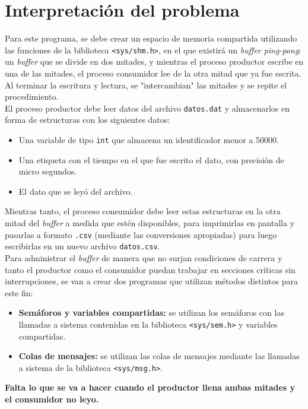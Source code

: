 \section{Interpretación del problema}
Para este programa, se debe crear un espacio de memoria compartida utilizando las funciones de la biblioteca \texttt{<sys/shm.h>}, en el que existirá un \textit{buffer ping-pong}: un \textit{buffer} que se divide en dos mitades, y mientras el proceso productor escribe en una de las mitades, el proceso consumidor lee de la otra mitad que ya fue escrita. Al terminar la escritura y lectura, se "intercambian" las mitades y se repite el procedimiento.\\

El proceso productor debe leer datos del archivo \texttt{datos.dat} y almacenarlos en forma de estructuras con los siguientes datos:\\

\begin{itemize}
    \item Una variable de tipo \texttt{int} que almacena un identificador menor a 50000.
    \item Una etiqueta con el tiempo en el que fue escrito el dato, con precisión de micro segundos.
    \item El dato que se leyó del archivo.\\
\end{itemize}

Mientras tanto, el proceso consumidor debe leer estas estructuras en la otra mitad del \textit{buffer} a medida que estén disponibles, para imprimirlas en pantalla y pasarlas a formato \texttt{.csv} (mediante las conversiones apropiadas) para luego escribirlas en un nuevo archivo \texttt{datos.csv}.\\

Para administrar el \textit{buffer} de manera que no surjan condiciones de carrera y tanto el productor como el consumidor puedan trabajar en secciones críticas sin interrupciones, se van a crear dos programas que utilizan métodos distintos para este fin:\\

\begin{itemize}
    \item \textbf{Semáforos y variables compartidas:} se utilizan los semáforos con las llamadas a sistema contenidas en la biblioteca \texttt{<sys/sem.h>} y variables compartidas.
    \item \textbf{Colas de mensajes:} se utilizan las colas de mensajes mediante las llamadas a sistema de la biblioteca \texttt{<sys/msg.h>}.\\
\end{itemize}

\textbf{Falta lo que se va a hacer cuando el productor llena ambas mitades y el consumidor no leyo.}\\
